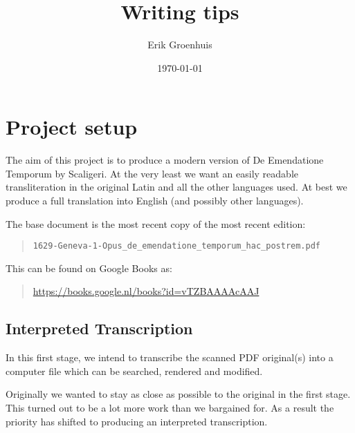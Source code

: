 \documentclass{report}
\title{Writing tips}
\author{Erik Groenhuis}
\date{\today}                                           %
\begin{document}
\maketitle

\tableofcontents{}




\chapter{Project setup}
The aim of this project is to produce a modern version of
De Emendatione Temporum by Scaligeri.
At the very least we want an easily readable transliteration
in the original Latin and all the other languages used.
At best we produce
a full translation into English (and possibly other languages).

The base document is the most recent copy of the most recent edition:
\begin{quote}
  \verb+1629-Geneva-1-Opus_de_emendatione_temporum_hac_postrem.pdf+
\end{quote}
This can be found on Google Books as:
\begin{quote}
  \url{https://books.google.nl/books?id=vTZBAAAAcAAJ}
\end{quote}



\section{Interpreted Transcription}
In this first stage, we intend to transcribe the scanned PDF original(s)
into a computer file which can be searched, rendered
and modified.

Originally we wanted to stay as close as possible to the original
in the first stage.
This turned out to be a lot more work than we bargained for.
As a result the priority has shifted to producing
an interpreted transcription.
\end{document}
